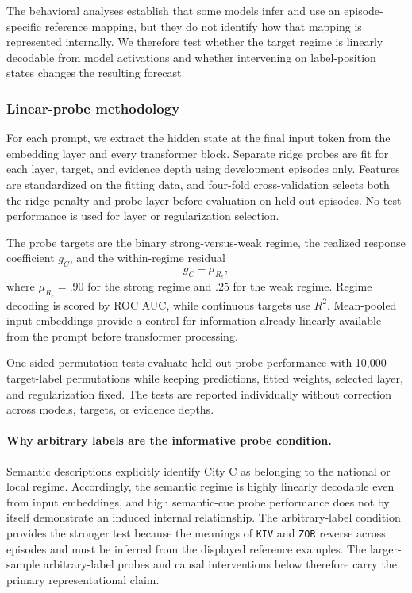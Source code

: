 The behavioral analyses establish that some models infer and use an episode-specific reference mapping, but they do not identify how that mapping is represented internally.
We therefore test whether the target regime is linearly decodable from model activations and whether intervening on label-position states changes the resulting forecast.

\subsubsection{Linear-probe methodology}

For each prompt, we extract the hidden state at the final input token from the embedding layer and every transformer block.
Separate ridge probes are fit for each layer, target, and evidence depth using development episodes only.
Features are standardized on the fitting data, and four-fold cross-validation selects both the ridge penalty and probe layer before evaluation on held-out episodes.
No test performance is used for layer or regularization selection.

The probe targets are the binary strong-versus-weak regime, the realized response coefficient \(g_C\), and the within-regime residual
\[
g_C-\mu_{R_e},
\]
where \(\mu_{R_e}=.90\) for the strong regime and \(.25\) for the weak regime.
Regime decoding is scored by ROC AUC, while continuous targets use \(R^2\).
Mean-pooled input embeddings provide a control for information already linearly available from the prompt before transformer processing.

One-sided permutation tests evaluate held-out probe performance with 10,000 target-label permutations while keeping predictions, fitted weights, selected layer, and regularization fixed.
The tests are reported individually without correction across models, targets, or evidence depths.

\paragraph{Why arbitrary labels are the informative probe condition.}

Semantic descriptions explicitly identify City C as belonging to the national or local regime.
Accordingly, the semantic regime is highly linearly decodable even from input embeddings, and high semantic-cue probe performance does not by itself demonstrate an induced internal relationship.
The arbitrary-label condition provides the stronger test because the meanings of \texttt{KIV} and \texttt{ZOR} reverse across episodes and must be inferred from the displayed reference examples.
The larger-sample arbitrary-label probes and causal interventions below therefore carry the primary representational claim.


